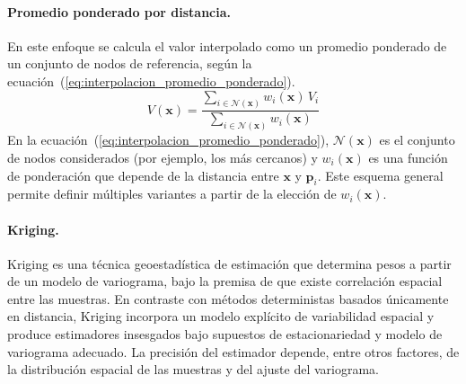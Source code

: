 \documentclass[a4paper,11pt]{book}
\begin{document}
\paragraph{Promedio ponderado por distancia.}
En este enfoque se calcula el valor interpolado como un promedio ponderado de un conjunto de nodos de referencia, según la ecuación~(\ref{eq:interpolacion_promedio_ponderado}).
\begin{equation}
	V(\mathbf{x}) = \frac{\sum_{i\in\mathcal{N}(\mathbf{x})} w_i(\mathbf{x})\, V_i}{\sum_{i\in\mathcal{N}(\mathbf{x})} w_i(\mathbf{x})}
	\label{eq:interpolacion_promedio_ponderado}
\end{equation}
En la ecuación~(\ref{eq:interpolacion_promedio_ponderado}), $\mathcal{N}(\mathbf{x})$ es el conjunto de nodos considerados (por ejemplo, los más cercanos) y $w_i(\mathbf{x})$ es una función de ponderación que depende de la distancia entre $\mathbf{x}$ y $\mathbf{p}_i$. Este esquema general permite definir múltiples variantes a partir de la elección de $w_i(\mathbf{x})$.

\paragraph{Kriging.}
Kriging es una técnica geoestadística de estimación que determina pesos a partir de un modelo de variograma, bajo la premisa de que existe correlación espacial entre las muestras. En contraste con métodos deterministas basados únicamente en distancia, Kriging incorpora un modelo explícito de variabilidad espacial y produce estimadores insesgados bajo supuestos de estacionariedad y modelo de variograma adecuado. La precisión del estimador depende, entre otros factores, de la distribución espacial de las muestras y del ajuste del variograma.
\end{document}
